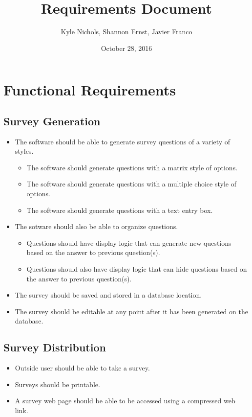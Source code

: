 \documentclass[letterpaper,10pt,titlepag,e draftclsnofoot,onecolumn]{IEEEtran}
\begin{document}
\title{Requirements Document}
\author{Kyle Nichols, Shannon Ernst, Javier Franco}
\date{October 28, 2016}
\maketitle

\section{Functional Requirements}

\subsection{Survey Generation}
\begin{itemize}
\item The software should be able to generate survey questions of a variety of styles.
	\begin{itemize}
	\item The software should generate questions with a matrix style of options.
	\item The software should generate questions with a multiple choice style of options.
	\item The software should generate questions with a text entry box.
	\end{itemize}
\item The sotware should also be able to organize questions.
	\begin{itemize}
	\item Questions should have display logic that can generate new questions based on the answer to previous question(s).
	\item Questions should also have display logic that can hide questions based on the answer to previous question(s).
	\end{itemize}
\item The survey should be saved and stored in a database location.
\item The survey should be editable at any point after it has been generated on the database.
\end{itemize}

\subsection{Survey Distribution}
\begin{itemize}
\item Outside user should be able to take a survey.
\item Surveys should be printable.
\item A survey web page should be able to be accessed using a compressed web link.
\end{itemize}
\end{document}
